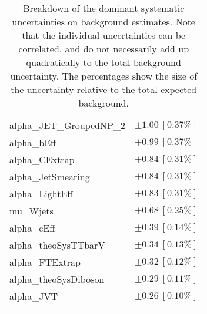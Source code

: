 \begin{table}
\begin{center}
\begin{tabular*}{\textwidth}{@{\extracolsep{\fill}}lc}
alpha\_JET\_GroupedNP\_2         & $\pm 1.00\ [0.37\%] $       \\
alpha\_bEff         & $\pm 0.99\ [0.37\%] $       \\
alpha\_CExtrap         & $\pm 0.84\ [0.31\%] $       \\
alpha\_JetSmearing         & $\pm 0.84\ [0.31\%] $       \\
alpha\_LightEff         & $\pm 0.83\ [0.31\%] $       \\
mu\_Wjets         & $\pm 0.68\ [0.25\%] $       \\
alpha\_cEff         & $\pm 0.39\ [0.14\%] $       \\
alpha\_theoSysTTbarV         & $\pm 0.34\ [0.13\%] $       \\
alpha\_FTExtrap         & $\pm 0.32\ [0.12\%] $       \\
alpha\_theoSysDiboson         & $\pm 0.29\ [0.11\%] $       \\
alpha\_JVT         & $\pm 0.26\ [0.10\%] $       \\
\noalign{\smallskip}\hline\noalign{\smallskip}
\end{tabular*}
\end{center}
\caption[Breakdown of uncertainty on background estimates]{
Breakdown of the dominant systematic uncertainties on background estimates.
Note that the individual uncertainties can be correlated, and do not necessarily add up quadratically to 
the total background uncertainty. The percentages show the size of the uncertainty relative to the total expected background.
\label{table.results.bkgestimate.uncertainties.VRTopD}}
\end{table}
%